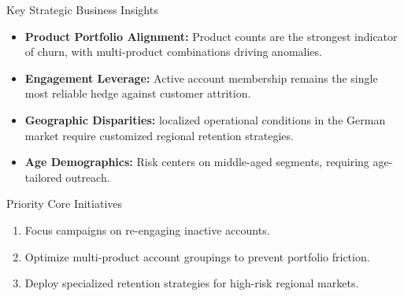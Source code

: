 \begin{frame}{Key Strategic Business Insights}
\scriptsize
\begin{itemize}
    \item \textbf{Product Portfolio Alignment:} Product counts are the strongest indicator of churn, with multi-product combinations driving anomalies.
    \item \textbf{Engagement Leverage:} Active account membership remains the single most reliable hedge against customer attrition.
    \item \textbf{Geographic Disparities:} localized operational conditions in the German market require customized regional retention strategies.
    \item \textbf{Age Demographics:} Risk centers on middle-aged segments, requiring age-tailored outreach.
\end{itemize}
\scriptsize
\begin{exampleblock}{Priority Core Initiatives}
    \begin{enumerate}
        \item Focus campaigns on re-engaging inactive accounts.
        \item Optimize multi-product account groupings to prevent portfolio friction.
        \item Deploy specialized retention strategies for high-risk regional markets.
    \end{enumerate}
\end{exampleblock}
\end{frame}